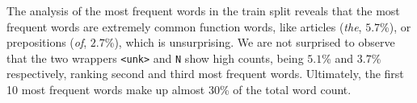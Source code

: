 The analysis of the most frequent words in the train split reveals that the most frequent words are extremely common function words, like articles (\textit{the}, \(5.7\)\%), or prepositions (\textit{of}, \(2.7\)\%), which is unsurprising. We are not surprised to observe that the two wrappers \texttt{<unk>} and \texttt{N} show high counts, being \(5.1\)\% and \(3.7\)\% respectively, ranking second and third most frequent words. Ultimately, the first 10 most frequent words make up almost 30\% of the total word count.


